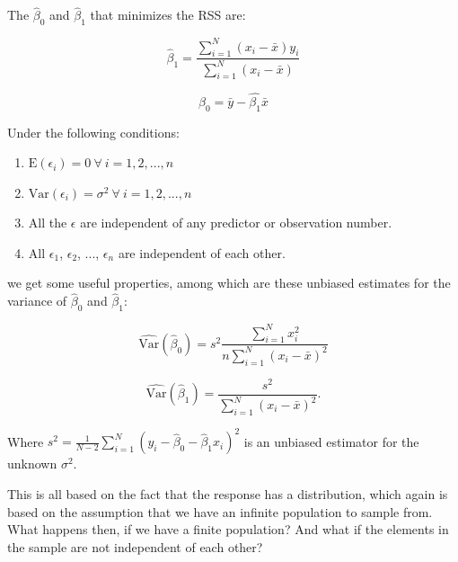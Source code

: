 \documentclass{article}
\begin{document}
The \(\hat{\beta}_0\) and \(\hat{\beta}_1\) that minimizes the RSS are:

\begin{equation*}
 \hat{\beta}_1 = \frac{\sum_{i = 1}^N\left( x_i - \bar{x} \right) y_i}{\sum_{i = 1}^N\left( x_i - \bar{x} \right)} 
\end{equation*}

\begin{equation*}
 \hat{\beta}_0 = \bar{y} - \hat{\beta_1}\bar{x} 
\end{equation*}

Under the following conditions:

\begin{enumerate}
\item \(\mathrm{E} \left( \epsilon_i \right) = 0\ \forall \ i = 1, 2, ..., n\)
\item \(\mathrm{Var} \left( \epsilon_i \right) = \sigma^2\ \forall \ i = 1, 2, ..., n\)
\item All the \(\epsilon\) are independent of any predictor or observation number.
\item All \(\epsilon_1\), \(\epsilon_2\), ..., \(\epsilon_n\) are independent of each other.
\end{enumerate}

we get some useful properties, among which are these unbiased estimates for the
variance of \(\hat{\beta}_0\) and \(\hat{\beta}_1\):

\begin{equation*}
  \widehat{\mathrm{Var}} \left( \hat{\beta}_0 \right) = s^2 \frac{\sum_{i = 1}^N x_i^2}{n
    \sum_{i = 1}^N \left( x_i - \bar{x} \right)^2}
\end{equation*}
  

\begin{equation*}
  \widehat{\mathrm{Var}} \left( \hat{\beta}_1 \right) = \frac{s^2}{
    \sum_{i = 1}^N \left( x_i - \bar{x} \right)^2}.
\end{equation*}

Where \(s^2 = \frac{1}{N - 2} \sum_{i = 1}^N\left( y_i - \hat{\beta}_0 -
  \hat{\beta}_1 x_i \right)^2\) is an
unbiased estimator for the unknown \(\sigma^2\).

This is all based on the fact that the response has a distribution, which again
is based on the assumption that we have an infinite population to sample from.
What happens then, if we have a finite population? And what if the elements in
the sample are not independent of each other?
\end{document}
